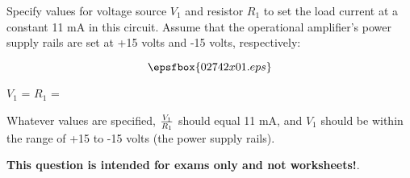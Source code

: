 

Specify values for voltage source $V_1$ and resistor $R_1$ to set the load current at a constant 11 mA in this circuit.  Assume that the operational amplifier's power supply rails are set at +15 volts and -15 volts, respectively:

$$\epsfbox{02742x01.eps}$$

$V_1$ = \hskip 80pt $R_1$ =







Whatever values are specified, $V_1 \over R_1$ should equal 11 mA, and $V_1$ should be within the range of +15 to -15 volts (the power supply rails).







{\bf This question is intended for exams only and not worksheets!}.




